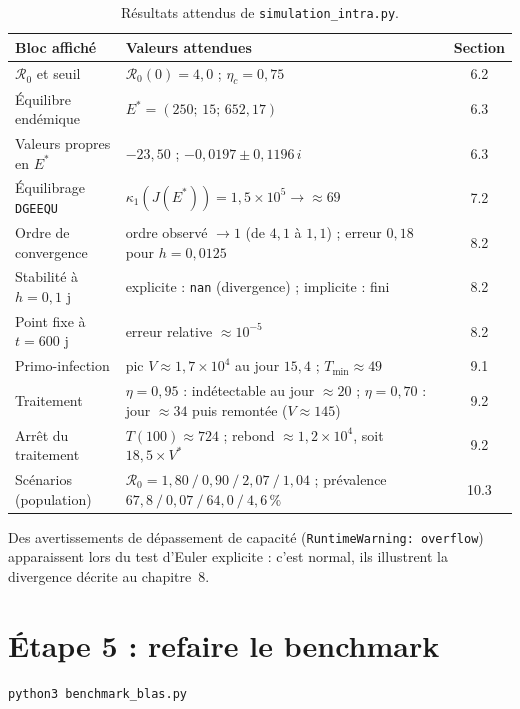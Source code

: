 \documentclass[11pt,a4paper]{report}
\theoremstyle{plain}
\theoremstyle{definition}
\theoremstyle{remark}
\newcommand{\Rzero}{\mathcal{R}_0}
\begin{document}
\begin{table}[ht]
\centering
\caption{Résultats attendus de \texttt{simulation\_intra.py}.}
\label{tab:attendu}
\begin{tabularx}{\textwidth}{l X c}
\toprule
\textbf{Bloc affiché} & \textbf{Valeurs attendues} & \textbf{Section} \\
\midrule
$\Rzero$ et seuil & $\Rzero(0)=4{,}0$ ; $\eta_c=0{,}75$ & 6.2 \\
Équilibre endémique & $E^*=(250;\,15;\,652{,}17)$ & 6.3 \\
Valeurs propres en $E^*$ & $-23{,}50$ ; $-0{,}0197\pm0{,}1196\,i$ & 6.3 \\
Équilibrage \texttt{DGEEQU} & $\kappa_1(J(E^*))=1{,}5\times10^5\to\approx69$ & 7.2 \\
Ordre de convergence & ordre observé $\to1$ (de $4{,}1$ à $1{,}1$) ; erreur $0{,}18$ pour $h=0{,}0125$ & 8.2 \\
Stabilité à $h=0{,}1$ j & explicite : \texttt{nan} (divergence) ; implicite : fini & 8.2 \\
Point fixe à $t=600$ j & erreur relative $\approx10^{-5}$ & 8.2 \\
Primo-infection & pic $V\approx1{,}7\times10^4$ au jour $15{,}4$ ; $T_{\min}\approx49$ & 9.1 \\
Traitement & $\eta=0{,}95$ : indétectable au jour $\approx20$ ; $\eta=0{,}70$ : jour $\approx34$ puis remontée ($V\approx145$) & 9.2 \\
Arrêt du traitement & $T(100)\approx724$ ; rebond $\approx1{,}2\times10^4$, soit $18{,}5\times V^*$ & 9.2 \\
Scénarios (population) & $\Rzero=1{,}80\ /\ 0{,}90\ /\ 2{,}07\ /\ 1{,}04$ ; prévalence $67{,}8\ /\ 0{,}07\ /\ 64{,}0\ /\ 4{,}6\,\%$ & 10.3 \\
\bottomrule
\end{tabularx}
\end{table}

\noindent Des avertissements de dépassement de capacité (\texttt{RuntimeWarning: overflow}) apparaissent lors du test d'Euler explicite : c'est normal, ils illustrent la divergence décrite au chapitre~8.

\section{Étape 5 : refaire le benchmark}

\begin{lstlisting}[language={}]
python3 benchmark_blas.py
\end{lstlisting}
\end{document}
